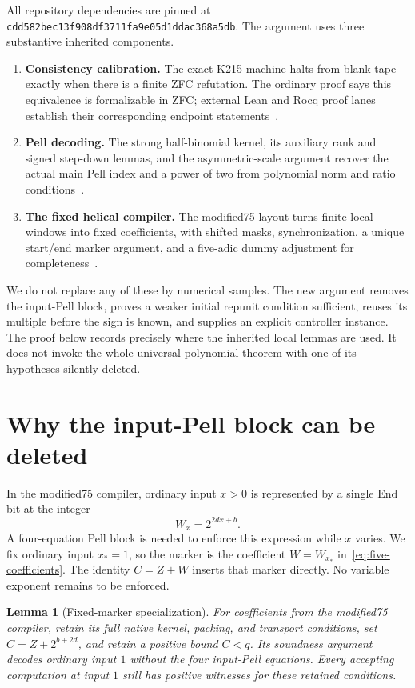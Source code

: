 \documentclass[11pt]{article}
\newtheorem{lemma}[theorem]{Lemma}
\theoremstyle{definition}
\newcommand{\repo}{\texttt{cdd582bec13f908df3711fa9e05d1ddac368a5db}}
\begin{document}
All repository dependencies are pinned at \repo. The argument uses three
substantive inherited components.

\begin{enumerate}
\item \textbf{Consistency calibration.} The exact K215 machine halts from
blank tape exactly when there is a finite ZFC refutation. The ordinary
proof says this equivalence is formalizable in ZFC; external Lean and Rocq
proof lanes establish their corresponding endpoint statements~\cite{K215}.
\item \textbf{Pell decoding.} The strong half-binomial kernel, its auxiliary
rank and signed step-down lemmas, and the asymmetric-scale argument recover
the actual main Pell index and a power of two from polynomial norm and
ratio conditions~\cite{Kernel,Asymmetric,Bezout}.
\item \textbf{The fixed helical compiler.} The modified75 layout turns
finite local windows into fixed coefficients, with shifted masks,
synchronization, a unique start/end marker argument, and a five-adic dummy
adjustment for completeness~\cite{Compiler75,CompilerDetails}.
\end{enumerate}

We do not replace any of these by numerical samples. The new argument
removes the input-Pell block, proves a weaker initial repunit condition
sufficient, reuses its multiple before the sign is known, and supplies an
explicit controller instance. The proof below records precisely where the
inherited local lemmas are used. It does not invoke the whole universal
polynomial theorem with one of its hypotheses silently deleted.

\section{Why the input-Pell block can be deleted}
\label{sec:fixed-input}

In the modified75 compiler, ordinary input $x>0$ is represented by a single
End bit at the integer
\[
 W_x=2^{2dx+b}.
\]
A four-equation Pell block is needed to enforce this expression while $x$
varies. We fix ordinary input $x_*=1$, so the marker is the coefficient
$W=W_{x_*}$ in~\eqref{eq:five-coefficients}. The identity $C=Z+W$ inserts
that marker directly. No variable exponent remains to be enforced.

\begin{lemma}[Fixed-marker specialization]\label{lem:fixed-marker}
For coefficients from the modified75 compiler, retain its full native
kernel, packing, and transport conditions, set $C=Z+2^{b+2d}$, and retain a
positive bound $C<q$. Its soundness argument decodes ordinary input $1$
without the four input-Pell equations. Every accepting computation at input
$1$ still has positive witnesses for these retained conditions.
\end{lemma}
\end{document}

